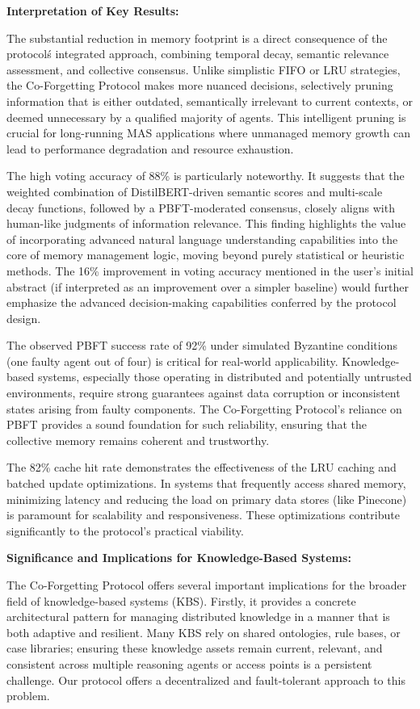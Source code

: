 \documentclass[conference]{IEEEtran}
\begin{document}
\textbf{Interpretation of Key Results:}

The substantial reduction in memory footprint is a direct consequence of the protocol\'s integrated approach, combining temporal decay, semantic relevance assessment, and collective consensus. Unlike simplistic FIFO or LRU strategies, the Co-Forgetting Protocol makes more nuanced decisions, selectively pruning information that is either outdated, semantically irrelevant to current contexts, or deemed unnecessary by a qualified majority of agents. This intelligent pruning is crucial for long-running MAS applications where unmanaged memory growth can lead to performance degradation and resource exhaustion.

The high voting accuracy of 88\% is particularly noteworthy. It suggests that the weighted combination of DistilBERT-driven semantic scores and multi-scale decay functions, followed by a PBFT-moderated consensus, closely aligns with human-like judgments of information relevance. This finding highlights the value of incorporating advanced natural language understanding capabilities into the core of memory management logic, moving beyond purely statistical or heuristic methods. The 16\% improvement in voting accuracy mentioned in the user's initial abstract (if interpreted as an improvement over a simpler baseline) would further emphasize the advanced decision-making capabilities conferred by the protocol design.

The observed PBFT success rate of 92\% under simulated Byzantine conditions (one faulty agent out of four) is critical for real-world applicability. Knowledge-based systems, especially those operating in distributed and potentially untrusted environments, require strong guarantees against data corruption or inconsistent states arising from faulty components. The Co-Forgetting Protocol’s reliance on PBFT provides a sound foundation for such reliability, ensuring that the collective memory remains coherent and trustworthy.

The 82\% cache hit rate demonstrates the effectiveness of the LRU caching and batched update optimizations. In systems that frequently access shared memory, minimizing latency and reducing the load on primary data stores (like Pinecone) is paramount for scalability and responsiveness. These optimizations contribute significantly to the protocol’s practical viability.

\textbf{Significance and Implications for Knowledge-Based Systems:}

The Co-Forgetting Protocol offers several important implications for the broader field of knowledge-based systems (KBS). Firstly, it provides a concrete architectural pattern for managing distributed knowledge in a manner that is both adaptive and resilient. Many KBS rely on shared ontologies, rule bases, or case libraries; ensuring these knowledge assets remain current, relevant, and consistent across multiple reasoning agents or access points is a persistent challenge. Our protocol offers a decentralized and fault-tolerant approach to this problem.
\end{document}
